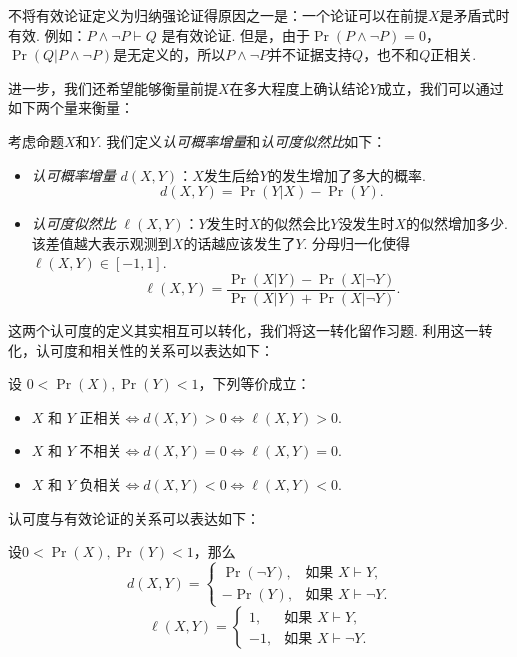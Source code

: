 不将有效论证定义为归纳强论证得原因之一是：一个论证可以在前提$X$是矛盾式时有效. 例如：$P \wedge \neg P \vdash Q$ 是有效论证. 但是，由于$\Pr(P \wedge \neg P) = 0$，$\Pr(Q | P \wedge \neg P)$是无定义的，所以$P \wedge \neg P$并不证据支持$Q$，也不和$Q$正相关.

进一步，我们还希望能够衡量前提$X$在多大程度上确认结论$Y$成立，我们可以通过如下两个量来衡量：
\begin{definition}[认可度]
考虑命题$X$和$Y$. 我们定义\emph{认可概率增量}和\emph{认可度似然比}如下：
\begin{itemize}
\item \emph{认可概率增量} $d(X, Y)$：$X$发生后给$Y$的发生增加了多大的概率.
\[
    d(X, Y) = \Pr(Y|X) - \Pr(Y).
\]
\item \emph{认可度似然比} $\ell(X, Y)$：$Y$发生时$X$的似然会比$Y$没发生时$X$的似然增加多少. 该差值越大表示观测到$X$的话越应该发生了$Y$. 分母归一化使得$\ell(X,Y)\in[-1,1]$.
\[
    \ell(X, Y) = \frac{\Pr(X|Y) - \Pr(X|\neg Y)}{\Pr(X|Y) + \Pr(X|\neg Y)}.
\]
\end{itemize} 
\end{definition}

这两个认可度的定义其实相互可以转化，我们将这一转化留作习题. 利用这一转化，认可度和相关性的关系可以表达如下：
\begin{proposition}
    设 $0< \Pr(X),\Pr(Y) < 1$，下列等价成立：
    \begin{itemize}
        \item $X$ 和 $Y$ 正相关$\iff d(X,Y) > 0\iff \ell(X, Y) > 0$.
        \item $X$ 和 $Y$ 不相关$\iff d(X, Y) = 0\iff \ell(X, Y) = 0$. 
        \item $X$ 和 $Y$ 负相关$\iff d(X,Y) < 0\iff\ell(X, Y) < 0$.
    \end{itemize}    
\end{proposition}

认可度与有效论证的关系可以表达如下：
\begin{proposition}
    设$0< \Pr(X),\Pr(Y) < 1$，那么
    \[
        d(X, Y) =
        \begin{cases}
            \Pr(\neg Y),& \text{如果 } X \vdash Y, \\
            -\Pr(Y),& \text{如果 } X \vdash \neg Y.
        \end{cases}
    \]
    \[\ell(X, Y) = 
        \begin{cases}
            1,& \text{如果 } X \vdash Y, \\
            -1,& \text{如果 } X \vdash \neg Y.
        \end{cases}
    \]
\end{proposition}


